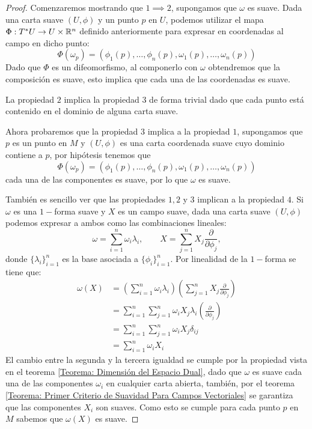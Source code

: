 \begin{proof}
	Comenzaremos mostrando que $1 \implies 2$, supongamos que $\omega$ es suave. Dada una carta suave $(U, \phi)$ y un punto $p$ en $U$, podemos utilizar el mapa $\Phi: T^{*}U \to U \times \mathbb{R}^n$ definido anteriormente para expresar en coordenadas al campo en dicho punto:
	\[
		\Phi(\omega_p) = (\phi_1(p), \ldots,\phi_n(p), \omega_1(p), \ldots, \omega_n(p))
	\]
	Dado que $\Phi$ es un difeomorfismo, al componerlo con $\omega$ obtendremos que la composición es suave, esto implica que cada una de las coordenadas es suave.

	La propiedad $2$ implica la propiedad $3$ de forma trivial dado que cada punto está contenido en el dominio de alguna carta suave.

	Ahora probaremos que la propiedad $3$ implica a la propiedad $1$, supongamos que $p$ es un punto en $M$ y $(U,\phi)$ es una carta coordenada suave cuyo dominio contiene a $p$, por hipótesis tenemos que
	\[
		\Phi(\omega_p) = (\phi_1(p), \ldots,\phi_n(p), \omega_1(p), \ldots, \omega_n(p))
	\]
	cada una de las componentes es suave, por lo que $\omega$ es suave.

	También es sencillo ver que las propiedades $1, 2$ y $3$ implican a la propiedad $4$. Si $\omega$ es una $1-$forma suave y $X$ es un campo suave, dada una carta suave $(U,\phi)$ podemos expresar a ambos como las combinaciones lineales:
	\[
		\omega = \sum_{i=1}^{n} \omega_i \lambda_i,
		\quad \quad
		X = \sum_{j=1}^{n} X_j \frac{\partial}{\partial \phi_j},
	\]
	donde $\{\lambda_i\}_{i=1}^{n}$ es la base asociada a $\{\phi_i\}_{i=1}^n$. Por linealidad de la $1-$forma se tiene que:
	\begin{align*}
		\omega(X) & =
		\left(\sum_{i=1}^{n} \omega_i \lambda_i\right)
		\left(\sum_{j=1}^{n} X_j \frac{\partial}{\partial \phi_j}\right)     \\
		          & =
		\sum_{i=1}^{n} \sum_{j=1}^{n}
		\omega_i X_j \lambda_i \left(\frac{\partial}{\partial \phi_j}\right) \\
		          & =
		\sum_{i=1}^{n} \sum_{j=1}^{n}
		\omega_i X_j \delta_{ij}                                             \\
		          & =
		\sum_{i=1}^{n} \omega_i X_i
	\end{align*}
	El cambio entre la segunda y la tercera igualdad se cumple por la propiedad vista en el teorema \ref{Teorema: Dimensión del Espacio Dual}, dado que $\omega$ es suave cada una de las componentes $\omega_i$ en cualquier carta abierta, también, por el teorema \ref{Teorema: Primer Criterio de Suavidad Para Campos Vectoriales} se garantiza que las componentes $X_i$ son suaves. Como esto se cumple para cada punto $p$ en $M$ sabemos que $\omega(X)$ es suave.


\end{proof}
